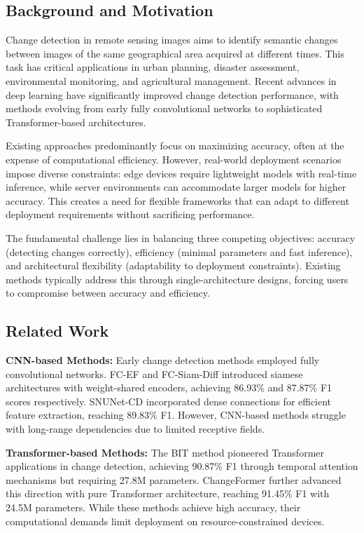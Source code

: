 \documentclass[journal]{IEEEtran}
\begin{document}
{\subsection{Background and Motivation}

Change detection in remote sensing images aims to identify semantic changes between images of the same geographical area acquired at different times. This task has critical applications in urban planning, disaster assessment, environmental monitoring, and agricultural management. Recent advances in deep learning have significantly improved change detection performance, with methods evolving from early fully convolutional networks to sophisticated Transformer-based architectures.

Existing approaches predominantly focus on maximizing accuracy, often at the expense of computational efficiency. However, real-world deployment scenarios impose diverse constraints: edge devices require lightweight models with real-time inference, while server environments can accommodate larger models for higher accuracy. This creates a need for flexible frameworks that can adapt to different deployment requirements without sacrificing performance.

The fundamental challenge lies in balancing three competing objectives: accuracy (detecting changes correctly), efficiency (minimal parameters and fast inference), and architectural flexibility (adaptability to deployment constraints). Existing methods typically address this through single-architecture designs, forcing users to compromise between accuracy and efficiency.

\subsection{Related Work}

\textbf{CNN-based Methods:} Early change detection methods employed fully convolutional networks. FC-EF \cite{fcsiam} and FC-Siam-Diff \cite{fcsiam} introduced siamese architectures with weight-shared encoders, achieving 86.93\% and 87.87\% F1 scores respectively. SNUNet-CD \cite{snunet} incorporated dense connections for efficient feature extraction, reaching 89.83\% F1. However, CNN-based methods struggle with long-range dependencies due to limited receptive fields.

\textbf{Transformer-based Methods:} The BIT method \cite{bit} pioneered Transformer applications in change detection, achieving 90.87\% F1 through temporal attention mechanisms but requiring 27.8M parameters. ChangeFormer \cite{changeforemer} further advanced this direction with pure Transformer architecture, reaching 91.45\% F1 with 24.5M parameters. While these methods achieve high accuracy, their computational demands limit deployment on resource-constrained devices.

}
\end{document}
